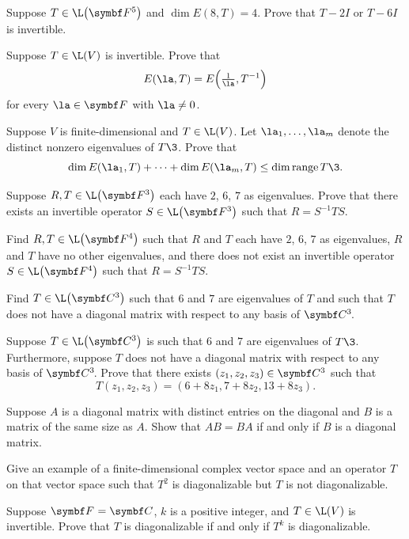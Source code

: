 \begin{exercises}

\exercise
Suppose $T \in \L\paren[\big]{\F{5}}$ and $\dim E(8, T) = 4$. Prove that $T - 2I$ or $T - 6I$ is invertible.

\pagebreak[1]


\exercise
Suppose $T \in \L(V)$ is invertible. Prove that
\[
E(\la, T) = E\paren[\Big]{\tfrac{1}{\la}, T^{-1}}
\]
for every $\la \in \F{}$ with $\la \ne 0$.


\exercise
Suppose $V$ is finite-dimensional and $T \in \L(V)$. Let $\la_1, \dots, \la_m$ denote the distinct nonzero eigenvalues of $T\3$. Prove that
\[
\dim E(\la_1, T) + \dots + \dim E(\la_m, T) \le \dim \ran T\3.
\]
\exercisedisplayend


\exercise
Suppose $R, T \in \L\paren[\big]{\F3}$ each have $2$, $6$, $7$ as eigenvalues. Prove that there exists an invertible operator $S \in \L\paren[\big]{\F3}$ such that $R = S^{-1} T S$.


\exercise
Find $R, T \in \L\paren[\big]{\F4}$ such that $R$ and $T$ each have $2$, $6$, $7$ as eigenvalues, $R$ and $T$ have no other eigenvalues, and there does not exist an invertible operator $S \in \L\paren[\big]{\F4}$ such that $R = S^{-1} T S$.


\exercise
Find $T \in \L\paren[\big]{\C3}$ such that $6$ and $7$ are eigenvalues of $T$ and such that $T$ does not have a diagonal matrix with respect to any basis of $\CC3$.


\exercise
Suppose $T \in \L\paren[\big]{\C3}$ is such that $6$ and $7$ are eigenvalues of $T\3$. Furthermore, suppose $T$ does not have a diagonal matrix with respect to any basis of $\CC3$. Prove that there exists $(z_1, z_2, z_3) \in \C3$ such that
\[
T(z_1, z_2, z_3) = (6 + 8z_1, 7 + 8z_2, 13 + 8z_3).
\]
\exercisedisplayend


\exercise
Suppose $A$ is a diagonal matrix with distinct entries on the diagonal and $B$ is a matrix of the same size as $A$. Show that $AB = BA$ if and only if $B$ is a diagonal matrix.


\exercise
\begin{SUBtheorem}
\item
Give an example of a finite-dimensional complex vector space and an operator $T$ on that vector space such that $T^2$ is diagonalizable but $T$ is not diagonalizable.
\item
Suppose $\F{} = \C{}$, $k$ is a positive integer, and $T \in \L(V)$ is invertible. Prove that $T$ is diagonalizable if and only if $T^k$ is diagonalizable.
\end{SUBtheorem}



\end{exercises}
